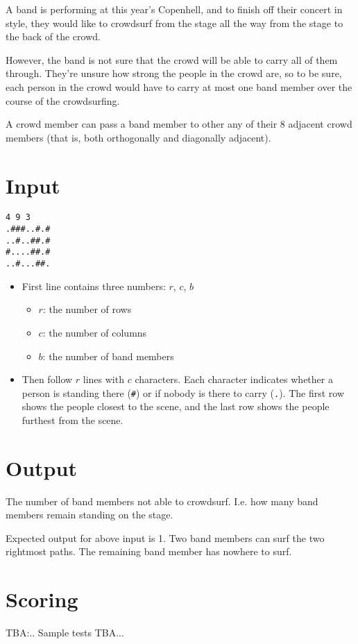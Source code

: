 

A band is performing at this year's Copenhell, and to finish off their concert in style, they would like to crowdsurf from the stage all the way from the stage to the back of the crowd.

However, the band is not sure that the crowd will be able to carry all of them through. They're unsure how strong the people in the crowd are, so to be sure, each person in the crowd would have to carry at most one band member over the course of the crowdsurfing.

A crowd member can pass a band member to other any of their 8 adjacent crowd members (that is, both orthogonally and diagonally adjacent).

\section*{Input}

\begin{verbatim}
4 9 3
.###..#.#
..#..##.#
#....##.#
..#...##.
\end{verbatim}

\begin{itemize}
  \item First line contains three numbers: $r$, $c$, $b$
    \begin{itemize}
      \item $r$: the number of rows
      \item $c$: the number of columns
      \item $b$: the number of band members
    \end{itemize}
  \item Then follow $r$ lines with $c$ characters. Each character indicates whether a person is standing there (\texttt{\#}) or if nobody is there to carry (\texttt{.}). The first row shows the people closest to the scene, and the last row shows the people furthest from the scene.
\end{itemize}

\section*{Output}

The number of band members not able to crowdsurf. I.e. how many band members remain standing on the stage.

Expected output for above input is 1. Two band members can surf the two rightmost paths. The remaining band member has nowhere to surf.

\section*{Scoring}

TBA:..
Sample tests TBA...
